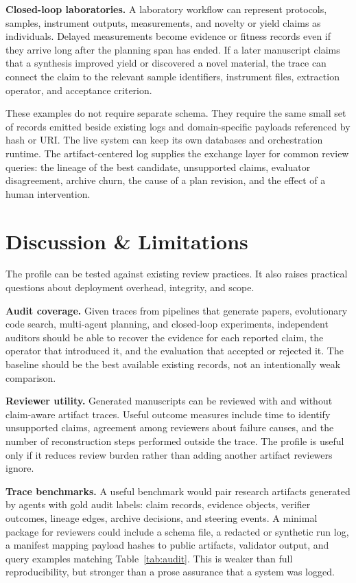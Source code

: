 \documentclass{article}
\begin{document}
\textbf{Closed-loop laboratories.} A laboratory workflow can represent protocols, samples, instrument outputs, measurements, and novelty or yield claims as individuals. Delayed measurements become evidence or fitness records even if they arrive long after the planning span has ended. If a later manuscript claims that a synthesis improved yield or discovered a novel material, the trace can connect the claim to the relevant sample identifiers, instrument files, extraction operator, and acceptance criterion.

These examples do not require separate schema. They require the same small set of records emitted beside existing logs and domain-specific payloads referenced by hash or URI. The live system can keep its own databases and orchestration runtime. The artifact-centered log supplies the exchange layer for common review queries: the lineage of the best candidate, unsupported claims, evaluator disagreement, archive churn, the cause of a plan revision, and the effect of a human intervention.

\section{Discussion \& Limitations}

The profile can be tested against existing review practices. It also raises practical questions about deployment overhead, integrity, and scope.

\textbf{Audit coverage.} Given traces from pipelines that generate papers, evolutionary code search, multi-agent planning, and closed-loop experiments, independent auditors should be able to recover the evidence for each reported claim, the operator that introduced it, and the evaluation that accepted or rejected it. The baseline should be the best available existing records, not an intentionally weak comparison.

\textbf{Reviewer utility.} Generated manuscripts can be reviewed with and without claim-aware artifact traces. Useful outcome measures include time to identify unsupported claims, agreement among reviewers about failure causes, and the number of reconstruction steps performed outside the trace. The profile is useful only if it reduces review burden rather than adding another artifact reviewers ignore.

\textbf{Trace benchmarks.} A useful benchmark would pair research artifacts generated by agents with gold audit labels: claim records, evidence objects, verifier outcomes, lineage edges, archive decisions, and steering events. A minimal package for reviewers could include a schema file, a redacted or synthetic run log, a manifest mapping payload hashes to public artifacts, validator output, and query examples matching Table~\ref{tab:audit}. This is weaker than full reproducibility, but stronger than a prose assurance that a system was logged.
\end{document}
